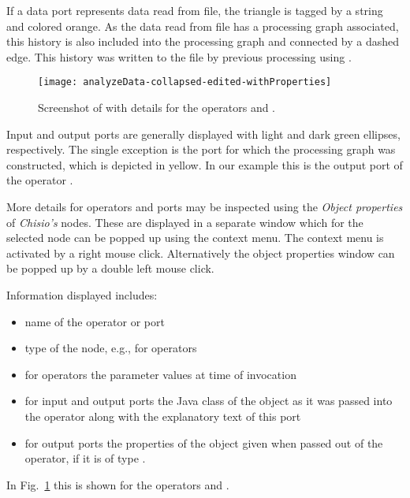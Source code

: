 If a data port represents data read from file,
the triangle is tagged by a string and colored orange.
As the data read from file 
has a processing graph associated,
this history is also included into the processing graph and 
connected by a dashed edge.
This history was written to the file  by previous
processing using \alida.


\begin{figure}
\begin{center}
{\texttt{[image: analyzeData-collapsed-edited-withProperties]}}
\caption{\label{fig:exa1}Screenshot of \mtbc with details for the operators
 and .
}
\end{center}
\end{figure}


Input and output ports are generally displayed with light and 
dark green ellipses, respectively. 
The single exception
is the port for which the processing graph was constructed, which is depicted in
yellow.
In our example this is the output port  of the
operator .

More details for operators and ports may be inspected using the \textit{Object properties}
of {\em Chisio's} nodes.
These are displayed in a separate window which
for the selected node can be popped up using the context menu.
The context menu is activated by a right mouse click.
Alternatively the object properties window can be popped up by a double left mouse click.

Information displayed includes:
\begin{itemize}
\item	name of the operator or port
\item	type of the node, e.g.,  for operators
\item	for operators the parameter values at time of invocation
\item	for input and output ports the Java class of the object as it was passed
into the operator along with the explanatory text of this port
\item	for output ports the properties of the object
	given when passed out of the operator, if it is of type .
\end{itemize}
In Fig.~\ref{fig:exa1} this is shown for the operators
 and .



